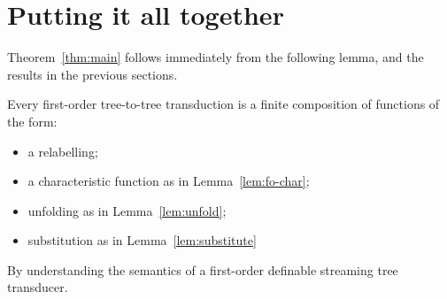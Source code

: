 \section{Putting it all together}


Theorem~\ref{thm:main} follows immediately from the following lemma, and the results in the previous sections.

\begin{lemma}
    Every first-order tree-to-tree transduction is a finite composition of functions of the form:
    \begin{itemize}
        \item a relabelling;
        \item a characteristic function as in Lemma~\ref{lem:fo-char};
        \item unfolding as in Lemma~\ref{lem:unfold};
        \item substitution as in Lemma~\ref{lem:substitute}
    \end{itemize}
\end{lemma}
\begin{pr}
    By understanding the semantics of a first-order definable streaming tree transducer.
\end{pr}